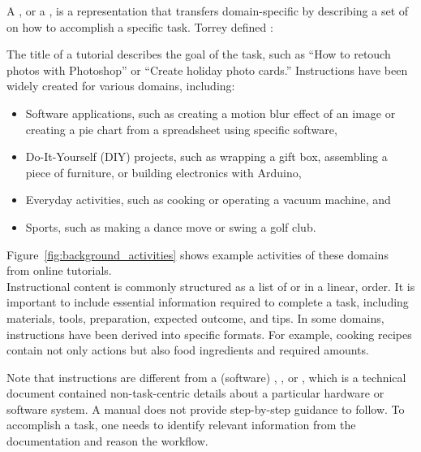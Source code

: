 A , or a , is a representation that transfers domain-specific  by describing a set of  on how to accomplish a specific task. Torrey \ea{} defined \cite{Torrey:2007he}:
\begin{quote}
\end{quote}
%
The title of a tutorial describes the goal of the task, such as ``How to retouch photos with Photoshop'' or ``Create holiday photo cards.''
%
Instructions have been widely created for various domains, including:

\begin{itemize}
  \itemsep -2pt
  \item Software applications, such as creating a motion blur effect of an image or creating a pie chart from a spreadsheet using specific software,
  \item Do-It-Yourself (DIY) projects, such as wrapping a gift box, assembling a piece of furniture, or building electronics with Arduino,
  \item Everyday activities, such as cooking or operating a vacuum machine, and
  \item Sports, such as making a dance move or swing a golf club.
\end{itemize}

Figure~\ref{fig:background_activities} shows example activities of these domains from online tutorials.
\\

%
Instructional content is commonly structured as a list of  or  in a linear,  order.
%
It is important to include essential information required to complete a task, including materials, tools, preparation, expected outcome, and tips.
%
In some domains, instructions have been derived into specific formats. For example, cooking recipes contain not only actions but also food ingredients and required amounts.

Note that instructions are different from a (software) , , or , which is a technical document contained non-task-centric details about a particular hardware or software system. A manual does not provide step-by-step guidance to follow. To accomplish a task, one needs to identify relevant information from the documentation and reason the workflow.

